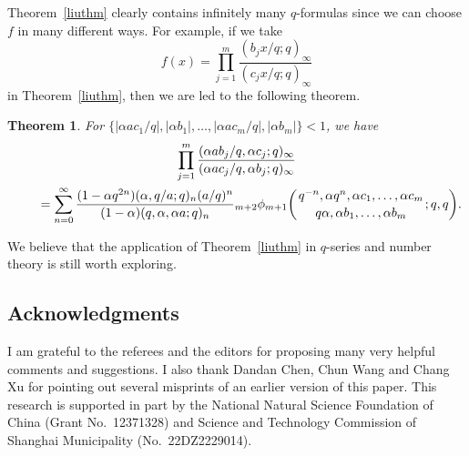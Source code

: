 \documentclass[10pt,a4paper]{amsart}
\numberwithin{equation}{section}
\newtheorem{Theorem}{Theorem}[section]
\begin{document}
Theorem~\ref{liuthm} clearly contains infinitely many $q$-formulas since we can choose $f$ in many different ways. For example, if we take
\[
f(x)=\prod_{j=1}^m \frac{(b_j x/q; q)_\infty} {(c_j x/q; q)_\infty}
\]
in Theorem~\ref{liuthm}, then we are led to the following theorem.
\begin{Theorem}%
For $\{|\alpha a c_1/q|, |\alpha b_1|, \ldots, |\alpha a c_m/q|, |\alpha b_m|\}<1$, we have
\begin{gather*}
\prod_{j=1}^m \frac{(\alpha a b_j/q, \alpha c_j; q)_\infty}
{(\alpha a c_j/q, \alpha b_j; q)_\infty}
\\
\qquad{}=\sum_{n=0}^\infty \frac{(1-\alpha q^{2n})(\alpha, q/a; q)_n (a/q)^n}{(1-\alpha)(q, \alpha,\alpha a; q)_n}
{_{m+2}\phi_{m+1}}\biggl({{q^{-n}, \alpha q^n, \alpha c_1, \ldots, \alpha c_m}\atop{q\alpha, \alpha b_1, \ldots, \alpha b_m}}; q, q\biggr).
\end{gather*}
\end{Theorem}
We believe that the application of Theorem~\ref{liuthm} in $q$-series and number theory is still worth exploring.

\subsection*{Acknowledgments}
I am grateful to the referees and the editors for proposing many very helpful comments and suggestions. I also thank Dandan Chen, Chun Wang and Chang Xu for pointing out several misprints of an earlier version of this paper. This research is supported in part by the National Natural Science Foundation of China (Grant No.~12371328) and Science and Technology Commission of Shanghai Municipality (No.~22DZ2229014).

\end{document}
